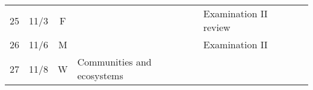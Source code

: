 \documentclass[]{article}
\begin{document}
\begin{longtable}[]{@{}ccclll@{}}
\begin{minipage}[t]{0.13\columnwidth}
25\strut
\end{minipage} & \begin{minipage}[t]{0.08\columnwidth}\centering\strut
11/3\strut
\end{minipage} & \begin{minipage}[t]{0.07\columnwidth}\centering\strut
F\strut
\end{minipage} & \begin{minipage}[t]{0.10\columnwidth}\raggedright\strut
\strut
\end{minipage} & \begin{minipage}[t]{0.12\columnwidth}\raggedright\strut
Examination II review\strut
\end{minipage} & \begin{minipage}[t]{0.12\columnwidth}\raggedright\strut
\strut
\end{minipage}\tabularnewline
\begin{minipage}[t]{0.13\columnwidth}\centering\strut
26\strut
\end{minipage} & \begin{minipage}[t]{0.08\columnwidth}\centering\strut
11/6\strut
\end{minipage} & \begin{minipage}[t]{0.07\columnwidth}\centering\strut
M\strut
\end{minipage} & \begin{minipage}[t]{0.10\columnwidth}\raggedright\strut
\strut
\end{minipage} & \begin{minipage}[t]{0.12\columnwidth}\raggedright\strut
Examination II\strut
\end{minipage} & \begin{minipage}[t]{0.12\columnwidth}\raggedright\strut
\strut
\end{minipage}\tabularnewline
\begin{minipage}[t]{0.13\columnwidth}\centering\strut
27\strut
\end{minipage} & \begin{minipage}[t]{0.08\columnwidth}\centering\strut
11/8\strut
\end{minipage} & \begin{minipage}[t]{0.07\columnwidth}\centering\strut
W\strut
\end{minipage} & \begin{minipage}[t]{0.10\columnwidth}\raggedright\strut
Communities and ecosystems\strut
\end{minipage} & \begin{minipage}[t]{0.12\columnwidth}\raggedright\strut

\end{minipage}
\end{longtable}
\end{document}
